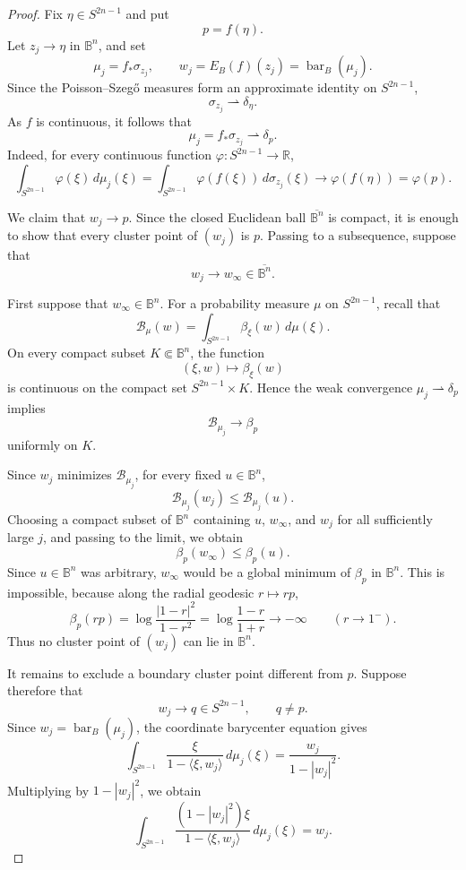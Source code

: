 \documentclass[11pt]{article}
\theoremstyle{definition}
\theoremstyle{remark}
\theoremstyle{definition}
\newcommand{\B}{\mathbb B}
\newcommand{\barB}{\operatorname{bar}_{B}}
\begin{document}
\begin{proof}
Fix \(\eta\in S^{2n-1}\) and put
\[
        p=f(\eta).
\]
Let \(z_j\to\eta\) in \(\B^n\), and set
\[
        \mu_j=f_*\sigma_{z_j},
        \qquad
        w_j=E_B(f)(z_j)=\barB(\mu_j).
\]
Since the Poisson--Szeg\H{o} measures form an approximate identity on
\(S^{2n-1}\),
\[
        \sigma_{z_j}\rightharpoonup\delta_\eta.
\]
As \(f\) is continuous, it follows that
\[
        \mu_j=f_*\sigma_{z_j}
        \rightharpoonup
        \delta_p.
\]
Indeed, for every continuous function
\(\varphi:S^{2n-1}\to\mathbb R\),
\[
\int_{S^{2n-1}}\varphi(\xi)\,d\mu_j(\xi)
=
\int_{S^{2n-1}}\varphi(f(\xi))\,d\sigma_{z_j}(\xi)
\longrightarrow
\varphi(f(\eta))
=
\varphi(p).
\]

We claim that \(w_j\to p\). Since the closed Euclidean ball
\(\overline{\B^n}\) is compact, it is enough to show that every cluster point
of \((w_j)\) is \(p\). Passing to a subsequence, suppose that
\[
        w_j\longrightarrow w_\infty\in\overline{\B^n}.
\]

First suppose that \(w_\infty\in\B^n\). For a probability measure \(\mu\) on
\(S^{2n-1}\), recall that
\[
        \mathcal B_\mu(w)
        =
        \int_{S^{2n-1}}\beta_\xi(w)\,d\mu(\xi).
\]
On every compact subset \(K\Subset\B^n\), the function
\[
        (\xi,w)\longmapsto\beta_\xi(w)
\]
is continuous on the compact set \(S^{2n-1}\times K\). Hence the weak
convergence \(\mu_j\rightharpoonup\delta_p\) implies
\[
        \mathcal B_{\mu_j}
        \longrightarrow
        \beta_p
\]
uniformly on \(K\).

Since \(w_j\) minimizes \(\mathcal B_{\mu_j}\), for every fixed
\(u\in\B^n\),
\[
        \mathcal B_{\mu_j}(w_j)
        \le
        \mathcal B_{\mu_j}(u).
\]
Choosing a compact subset of \(\B^n\) containing \(u\), \(w_\infty\), and
\(w_j\) for all sufficiently large \(j\), and passing to the limit, we obtain
\[
        \beta_p(w_\infty)\le\beta_p(u).
\]
Since \(u\in\B^n\) was arbitrary, \(w_\infty\) would be a global minimum of
\(\beta_p\) in \(\B^n\). This is impossible, because along the radial
geodesic \(r\mapsto rp\),
\[
        \beta_p(rp)
        =
        \log\frac{|1-r|^2}{1-r^2}
        =
        \log\frac{1-r}{1+r}
        \longrightarrow -\infty
        \qquad (r\to1^-).
\]
Thus no cluster point of \((w_j)\) can lie in \(\B^n\).

It remains to exclude a boundary cluster point different from \(p\).
Suppose therefore that
\[
        w_j\longrightarrow q\in S^{2n-1},
        \qquad q\ne p.
\]
Since \(w_j=\barB(\mu_j)\), the coordinate barycenter equation gives
\[
        \int_{S^{2n-1}}
        \frac{\xi}{1-\langle \xi,w_j\rangle}\,d\mu_j(\xi)
        =
        \frac{w_j}{1-|w_j|^2}.
\]
Multiplying by \(1-|w_j|^2\), we obtain
\begin{equation}\label{boundary-barycenter-scaled}
        \int_{S^{2n-1}}
        \frac{(1-|w_j|^2)\xi}
             {1-\langle \xi,w_j\rangle}\,d\mu_j(\xi)
        =
        w_j.
\end{equation}


\end{proof}
\end{document}
